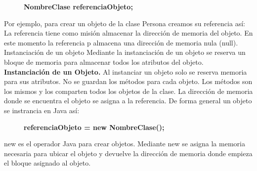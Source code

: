 \documentclass[a4paper]{article}
\begin{document}
\begin{figure}[H]
	\centering	
	\textbf{NombreClase referenciaObjeto;}
\end{figure}

Por ejemplo, para crear un objeto de la clase Persona creamos su referencia así: 
\\
La referencia tiene como misión almacenar la dirección de memoria del objeto. En este momento la referencia p almacena una dirección de memoria nula (null).\\

Instanciación de un objeto Mediante la instanciación de un objeto se reserva un bloque de memoria para almacenar todos los atributos del objeto. \\

\textbf{Instanciación de un Objeto.}
Al instanciar un objeto solo se reserva memoria para sus atributos. No se guardan los métodos para cada objeto. Los métodos son los mismos y los comparten todos los objetos de la clase.
La dirección de memoria donde se encuentra el objeto se asigna a la referencia. De forma general un objeto se instrancia en Java así:
\begin{figure}[H]
	\centering
	\textbf{referenciaObjeto = new NombreClase();}
\end{figure}
new es el operador Java para crear objetos. Mediante new se asigna la memoria necesaria para ubicar el objeto y devuelve la dirección de memoria donde empieza el bloque asignado al objeto.
\end{document}
